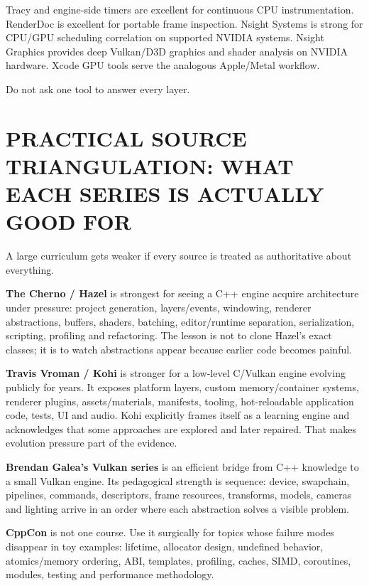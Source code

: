 Tracy and engine-side timers are excellent for continuous CPU instrumentation. RenderDoc is excellent for portable frame inspection. Nsight Systems is strong for CPU/GPU scheduling correlation on supported NVIDIA systems. Nsight Graphics provides deep Vulkan/D3D graphics and shader analysis on NVIDIA hardware. Xcode GPU tools serve the analogous Apple/Metal workflow.

Do not ask one tool to answer every layer.

\section{PRACTICAL SOURCE TRIANGULATION: WHAT EACH SERIES IS ACTUALLY GOOD FOR}\label{05-engine-i-ch008-practical-source-triangulation-what-each-series-is-actually-good-for}

A large curriculum gets weaker if every source is treated as authoritative about everything.

\textbf{The Cherno / Hazel} is strongest for seeing a C++ engine acquire architecture under pressure: project generation, layers/events, windowing, renderer abstractions, buffers, shaders, batching, editor/runtime separation, serialization, scripting, profiling and refactoring. The lesson is not to clone Hazel's exact classes; it is to watch abstractions appear because earlier code becomes painful.

\textbf{Travis Vroman / Kohi} is stronger for a low-level C/Vulkan engine evolving publicly for years. It exposes platform layers, custom memory/container systems, renderer plugins, assets/materials, manifests, tooling, hot-reloadable application code, tests, UI and audio. Kohi explicitly frames itself as a learning engine and acknowledges that some approaches are explored and later repaired. That makes evolution pressure part of the evidence.

\textbf{Brendan Galea's Vulkan series} is an efficient bridge from C++ knowledge to a small Vulkan engine. Its pedagogical strength is sequence: device, swapchain, pipelines, commands, descriptors, frame resources, transforms, models, cameras and lighting arrive in an order where each abstraction solves a visible problem.

\textbf{CppCon} is not one course. Use it surgically for topics whose failure modes disappear in toy examples: lifetime, allocator design, undefined behavior, atomics/memory ordering, ABI, templates, profiling, caches, SIMD, coroutines, modules, testing and performance methodology.

